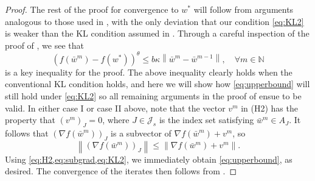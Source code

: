 \documentclass{article}
\newcommand{\alerttt}[1]{{#1}}
\theoremstyle{plain}
\theoremstyle{definition}
\theoremstyle{remark}
\newcommand{\J}{\mathcal{J}}
\newcommand{\jh}[1]{\footnote{\textbf{JH:} #1}}
\newcommand{\norm}[1]{{\left\|{#1}\right\|}}
\begin{document}
\begin{proof}
	The rest of the proof for convergence to $w^*$ will follow from
	arguments analogous to those used in \cite{HA13a}, with the only
	deviation that our condition \cref{eq:KL2} is weaker than the KL
	condition assumed in \cite{HA13a}.
	Through a careful inspection of the proof of
	\cite[Lemma~2.6,Corollary~2.8]{HA13a}, we see that
		\begin{equation}
			\label{eq:upperbound}
			(f(\bar{w}^m)-f(w^*))^{\alerttt{ \theta}} \leq
		\alerttt{b\kappa}\norm{\bar{w}^m-\bar{w}^{m-1}} , \quad
		\forall m\in \mathbb{N} 
		\end{equation}
	is a key inequality for the proof.
	The above inequality clearly holds when the conventional KL
	condition holds, and here we will show how \cref{eq:upperbound} will
	still hold under \cref{eq:KL2} so
	all remaining arguments in the proof of
	\cite[Lemma~2.6,Corollary~2.8]{HA13a} ensue to be valid.
	In either case I or case II above, note that the 
	vector $v^m$ in (H2) has the property that $(v^m)_{J}=0$, where $J\in \J_s$ 
	is the index set satisfying $\bar{w}^m\in A_J$. It follows that $(\nabla f(\bar{w}^m))_J$ is 
	a subvector of $\nabla f(\bar{w}^m)+v^m$, so
	\begin{equation}
		\norm{(\nabla f(\bar{w}^m))_J} \leq \norm{\nabla
			f(\bar{w}^m)+v^m}.
			\label{eq:subgrad}
	\end{equation}
	Using \cref{eq:H2,eq:subgrad,eq:KL2},
	we immediately obtain \cref{eq:upperbound}, as desired. 
	The convergence of the
	iterates then follows from \cite[Theorem 2.9]{HA13a}.
	

\end{proof}
\end{document}

